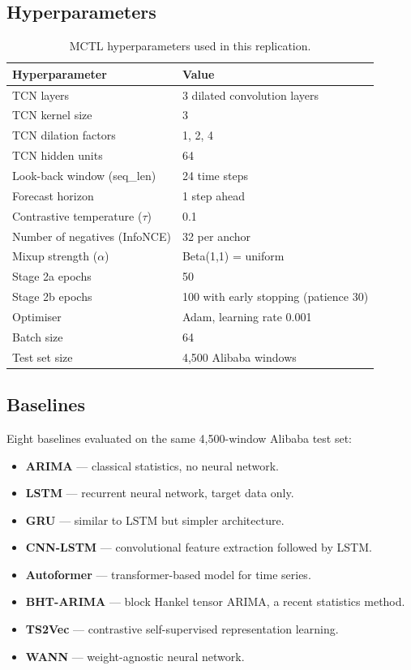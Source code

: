 \documentclass[12pt,a4paper]{article}
\begin{document}
\subsection{Hyperparameters}

\begin{table}[H]
\centering
\small
\caption{MCTL hyperparameters used in this replication.}
\begin{tabular}{@{}ll@{}}
\toprule
\textbf{Hyperparameter} & \textbf{Value} \\
\midrule
TCN layers & 3 dilated convolution layers \\
TCN kernel size & 3 \\
TCN dilation factors & 1, 2, 4 \\
TCN hidden units & 64 \\
Look-back window (seq\_len) & 24 time steps \\
Forecast horizon & 1 step ahead \\
Contrastive temperature ($\tau$) & 0.1 \\
Number of negatives (InfoNCE) & 32 per anchor \\
Mixup strength ($\alpha$) & Beta(1,1) = uniform \\
Stage 2a epochs & 50 \\
Stage 2b epochs & 100 with early stopping (patience 30) \\
Optimiser & Adam, learning rate 0.001 \\
Batch size & 64 \\
Test set size & 4,500 Alibaba windows \\
\bottomrule
\end{tabular}
\end{table}

\subsection{Baselines}

Eight baselines evaluated on the same 4,500-window Alibaba test set:

\begin{itemize}
  \item \textbf{ARIMA} --- classical statistics, no neural network.
  \item \textbf{LSTM} --- recurrent neural network, target data only.
  \item \textbf{GRU} --- similar to LSTM but simpler architecture.
  \item \textbf{CNN-LSTM} --- convolutional feature extraction followed by LSTM.
  \item \textbf{Autoformer} --- transformer-based model for time series.
  \item \textbf{BHT-ARIMA} --- block Hankel tensor ARIMA, a recent statistics method.
  \item \textbf{TS2Vec} --- contrastive self-supervised representation learning.
  \item \textbf{WANN} --- weight-agnostic neural network.
\end{itemize}
\end{document}
